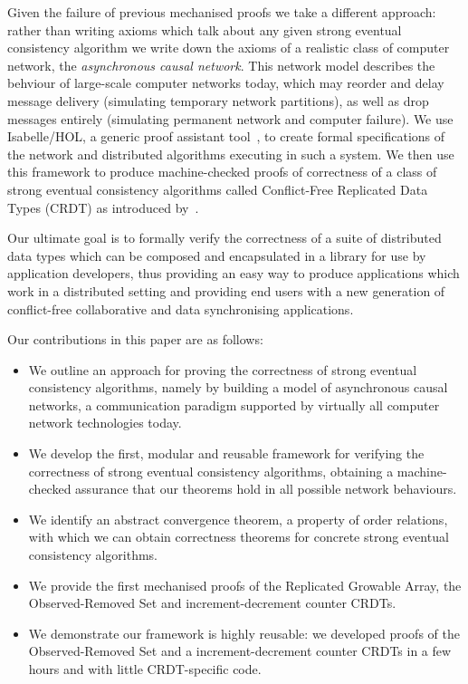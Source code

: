 \documentclass[acmlarge,review,anonymous]{acmart}\settopmatter{printfolios=true}
\begin{document}
Given the failure of previous mechanised proofs we take a different approach: rather than writing axioms which talk about any given strong eventual consistency algorithm we write down the axioms of a realistic class of computer network, the \emph{asynchronous causal network}.
This network model describes the behviour of large-scale computer networks today, which may reorder and delay message delivery (simulating temporary network partitions), as well as drop messages entirely (simulating permanent network and computer failure).
We use Isabelle/HOL, a generic proof assistant tool~\cite{DBLP:conf/tphol/WenzelPN08}, to create formal specifications of the network and distributed algorithms executing in such a system. 
We then use this framework to produce machine-checked proofs of correctness of a class of strong eventual consistency algorithms called Conflict-Free Replicated Data Types (CRDT) as introduced by~\citet{Shapiro:2011wy,Shapiro:2011un}. 

Our ultimate goal is to formally verify the correctness of a suite of distributed data types which can be composed and encapsulated in a library for use by application developers, thus providing an easy way to produce applications which work in a distributed setting and providing end users with a new generation of conflict-free collaborative and data synchronising applications.

Our contributions in this paper are as follows:
\begin{itemize}
\item We outline an approach for proving the correctness of strong eventual consistency algorithms, namely by building a model of asynchronous causal networks, a communication paradigm supported by virtually all computer network technologies today.
%
\item We develop the first, modular and reusable framework for verifying the correctness of strong eventual consistency algorithms, obtaining a machine-checked assurance that our theorems hold in all possible network behaviours.
%
\item We identify an abstract convergence theorem, a property of order relations, with which we can obtain correctness theorems for concrete strong eventual consistency algorithms.
%
\item We provide the first mechanised proofs of the Replicated Growable Array, the Observed-Removed Set and increment-decrement counter CRDTs. 
%
\item We demonstrate our framework is highly reusable: we developed proofs of the Observed-Removed Set and a increment-decrement counter CRDTs in a few hours and with little CRDT-specific code.
\end{itemize}
\end{document}
